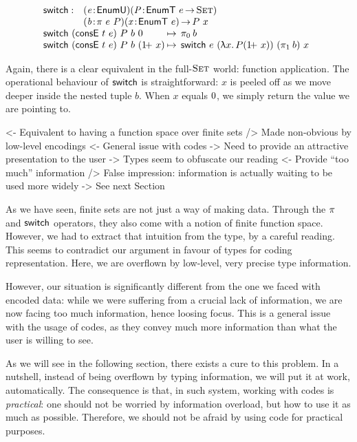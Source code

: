 \[\stk{
\begin{array}{@{}ll}
\F{switch} : & \PITEL{\V{e}}{\EnumU}
               \PITEL{\V{P}}{\EnumT{e} \To \Set} \\
             & \PITEL{\V{b}}{\spi{e}{P}}
               \PITEL{\V{x}}{\EnumT{e}} \To P~x
\end{array} \\
\begin{array}{@{}l@{\:\mapsto\:\:}l}
\switch{(\ConsE{t}{e})}{P}{b}{\Ze}      & \fst{b} \\
\switch{(\ConsE{t}{e})}{P}{b}{(\Su{x})} & \switch{e}{(\LAM{x} P
  (\Su{x}))}{(\snd{b})}{x}
\end{array}
}\]

Again, there is a clear equivalent in the full-$\Set$ world: function
application. The operational behaviour of $\F{switch}$ is
straightforward: $x$ is peeled off as we move deeper inside the nested
tuple $b$. When $x$ equals $\Ze$, we simply return the value we are
pointing to.

\begin{wstructure}
<- Equivalent to having a function space over finite sets
    /> Made non-obvious by low-level encodings
        <- General issue with codes
             -> Need to provide an attractive presentation to the user
    -> Types seem to obfuscate our reading
        <- Provide ``too much'' information
        /> False impression: information is actually waiting to be used more widely
        -> See next Section
\end{wstructure}

As we have seen, finite sets are not just a way of making
data. Through the $\spi{}{}$ and $\F{switch}$ operators, they also
come with a notion of finite function space. However, we had to
extract that intuition from the type, by a careful reading. This seems
to contradict our argument in favour of types for coding
representation. Here, we are overflown by low-level, very precise type
information.

However, our situation is significantly different from the one we
faced with encoded data: while we were suffering from a crucial lack
of information, we are now facing too much information, hence loosing
focus. This is a general issue with the usage of codes, as they convey
much more information than what the user is willing to see. 

As we will see in the following section, there exists a cure to this
problem. In a nutshell, instead of being overflown by typing
information, we will put it at work, automatically. The consequence is
that, in such system, working with codes is \emph{practical}: one
should not be worried by information overload, but how to use it as
much as possible. Therefore, we should not be afraid by using code for
practical purposes.



